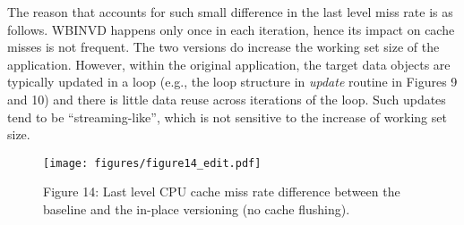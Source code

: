 The reason that accounts for such small difference in the last level miss rate is as follows. {\selectfont WBINVD} happens only once in each iteration, hence its impact on cache misses is not frequent. The two versions do increase the working set size of the application. However, within the original application, the target data objects are typically updated in a loop (e.g., the loop structure in \textit{update} routine in Figures 9 and 10) and there is
little data reuse across iterations of the loop. Such updates tend to be ``streaming-like'', which is not sensitive to the increase of working set size.
\vspace{-10pt}

\begin{figure}
\centering
\texttt{[image: figures/figure14\_edit.pdf]}
\vspace{-20pt}
\caption*{Figure 14: Last level CPU cache miss rate difference between the baseline and the in-place versioning (no cache flushing).}
\label{fig:cache_miss_rate}
\vspace{-10pt}
\end{figure}

\begin{comment}
To further study the performance cost of the in-place versioning, we profile
last level cache miss rate based on PAPI~\cite{} for the main computation loop of those applications.
The results show ignorable change of last level cache miss rate. Those results are consistent with the ones shown in Figure~\ref{fig:Dual_clean}:
The performance cost with the in-place versioning is small.
\end{comment}

\begin{comment}
\textbf{TODO: polish the following paragraph.}
It is because the memory access pattern in such benchmark is "Streaming", which means there is litter cache reuse across iteration. Furthermore, it is safe to assume that "streaming access pattern" applied to target object of most HPC benchmarks. 

\textbf{xxx} performance difference.
\end{comment}
